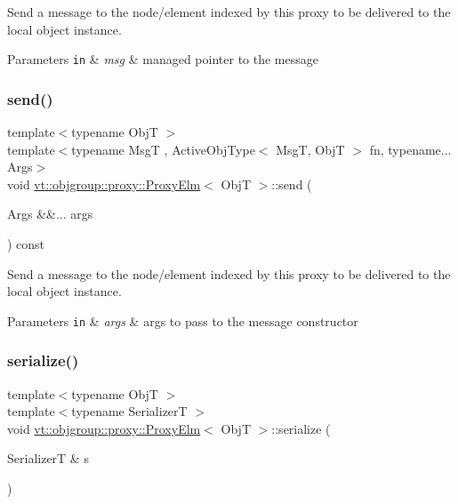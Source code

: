 Send a message to the node/element indexed by this proxy to be delivered to the local object instance. 


\begin{DoxyParams}[1]{Parameters}
\mbox{\tt in}  & {\em msg} & managed pointer to the message \\
\hline
\end{DoxyParams}
\mbox{\label{structvt_1_1objgroup_1_1proxy_1_1_proxy_elm_aadfbb21b80482657fd2a7eba65ad7b48}} 
\subsubsection{\texorpdfstring{send()}{send()}\hspace{0.1cm}{\footnotesize\ttfamily [3/3]}}
{\footnotesize\ttfamily template$<$typename ObjT $>$ \\
template$<$typename MsgT , Active\+Obj\+Type$<$ Msg\+T, Obj\+T $>$ fn, typename... Args$>$ \\
void \hyperlink{structvt_1_1objgroup_1_1proxy_1_1_proxy_elm}{vt\+::objgroup\+::proxy\+::\+Proxy\+Elm}$<$ ObjT $>$\+::send (\begin{DoxyParamCaption}\item[{Args \&\&...}]{args }\end{DoxyParamCaption}) const}



Send a message to the node/element indexed by this proxy to be delivered to the local object instance. 


\begin{DoxyParams}[1]{Parameters}
\mbox{\tt in}  & {\em args} & args to pass to the message constructor \\
\hline
\end{DoxyParams}
\mbox{\label{structvt_1_1objgroup_1_1proxy_1_1_proxy_elm_aa2c6be8bfa1113516cd6e8b3d7bd0445}} 
\subsubsection{\texorpdfstring{serialize()}{serialize()}}
{\footnotesize\ttfamily template$<$typename ObjT $>$ \\
template$<$typename SerializerT $>$ \\
void \hyperlink{structvt_1_1objgroup_1_1proxy_1_1_proxy_elm}{vt\+::objgroup\+::proxy\+::\+Proxy\+Elm}$<$ ObjT $>$\+::serialize (\begin{DoxyParamCaption}\item[{SerializerT \&}]{s }\end{DoxyParamCaption})}



